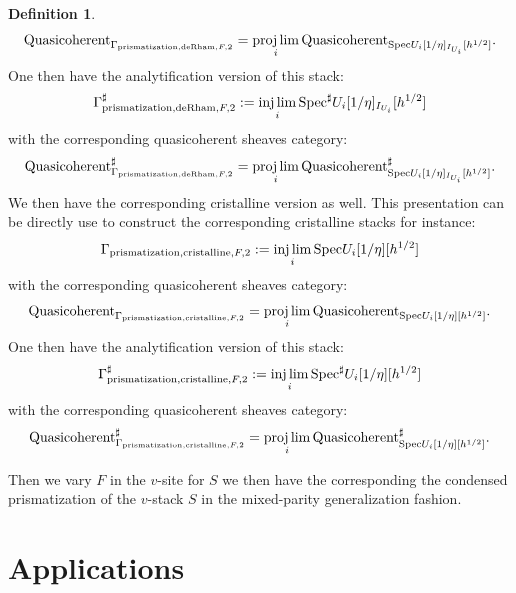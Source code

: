 \documentclass[12pt]{article}
\theoremstyle{definition}
\newtheorem{definition}{Definition}
\begin{document}
\begin{definition}
\begin{align}
\mathrm{Quasicoherent}_{\mathrm{\Gamma}_{\mathrm{prismatization},\mathrm{deRham},F,2}}=\projlim_i \mathrm{Quasicoherent}_{\mathrm{Spec}U_i[1/\eta]_{I_{U_i}}[h^{1/2}]}.
\end{align}
One then have the analytification version of this stack:
\begin{align}
\mathrm{\Gamma}^\sharp_{\mathrm{prismatization},\mathrm{deRham},F,2}:=\injlim_i \mathrm{Spec}^\sharp U_i[1/\eta]_{I_{U_i}}[h^{1/2}]
\end{align}
with the corresponding quasicoherent sheaves category:
\begin{align}
\mathrm{Quasicoherent}^\sharp_{\mathrm{\Gamma}_{\mathrm{prismatization},\mathrm{deRham},F,2}}=\projlim_i \mathrm{Quasicoherent}^\sharp_{\mathrm{Spec}U_i[1/\eta]_{I_{U_i}}[h^{1/2}]}.
\end{align}
We then have the corresponding cristalline version as well. This presentation can be directly use to construct the corresponding cristalline stacks for instance:
\begin{align}
\mathrm{\Gamma}_{\mathrm{prismatization},\mathrm{cristalline},F,2}:=\injlim_i \mathrm{Spec}U_i[1/\eta][h^{1/2}]
\end{align}
with the corresponding quasicoherent sheaves category:
\begin{align}
\mathrm{Quasicoherent}_{\mathrm{\Gamma}_{\mathrm{prismatization},\mathrm{cristalline},F,2}}=\projlim_i \mathrm{Quasicoherent}_{\mathrm{Spec}U_i[1/\eta][h^{1/2}]}.
\end{align}
One then have the analytification version of this stack:
\begin{align}
\mathrm{\Gamma}^\sharp_{\mathrm{prismatization},\mathrm{cristalline},F,2}:=\injlim_i \mathrm{Spec}^\sharp U_i[1/\eta][h^{1/2}]
\end{align}
with the corresponding quasicoherent sheaves category:
\begin{align}
\mathrm{Quasicoherent}^\sharp_{\mathrm{\Gamma}_{\mathrm{prismatization},\mathrm{cristalline},F,2}}=\projlim_i \mathrm{Quasicoherent}^\sharp_{\mathrm{Spec}U_i[1/\eta][h^{1/2}]}.
\end{align} 
\end{definition}


\indent Then we vary $F$ in the $v$-site for $S$ we then have the corresponding the condensed prismatization of the $v$-stack $S$ in the mixed-parity generalization fashion.

\newpage
\section{Applications}
\end{document}
